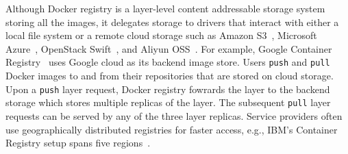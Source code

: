 %

Although Docker registry
is a layer-level content addressable storage system storing all the images, it
delegates storage to drivers that interact with either a local file system or a
remote cloud storage such as Amazon S3~\cite{s3}, Microsoft Azure~\cite{azure},
OpenStack Swift~\cite{swift}, and Aliyun OSS~\cite{aliyun}.  For example,
Google Container Registry~\cite{GoogleContainerRegistry} uses Google cloud as
its backend image store.  Users \texttt{push} and \texttt{pull} Docker images
to and from their repositories that are stored on cloud storage. 
Upon a \texttt{push} layer request, Docker registry fowrards the layer to the
backend storage which stores multiple replicas of the layer.
The subsequent \texttt{pull} layer requests can be served by 
any of the three layer replicas.
Service providers often use geographically
distributed registries for faster access, e.g., IBM's Container Registry setup
spans five regions~\cite{dockerworkload}. 






